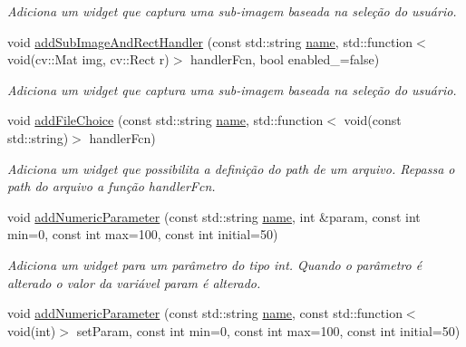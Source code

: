 \begin{DoxyCompactItemize}
\begin{DoxyCompactList}\small\item\em Adiciona um widget que captura uma sub-\/imagem baseada na seleção do usuário. \end{DoxyCompactList}\item 
\hypertarget{class_process_control_acbe523f427680c7b63756a998822c963}{}void \hyperlink{class_process_control_acbe523f427680c7b63756a998822c963}{add\+Sub\+Image\+And\+Rect\+Handler} (const std\+::string \hyperlink{class_process_control_abc29e461e01cc0c712944f8f47f91331}{name}, std\+::function$<$ void(cv\+::\+Mat img, cv\+::\+Rect r)$>$ handler\+Fcn, bool enabled\+\_\+=false)\label{class_process_control_acbe523f427680c7b63756a998822c963}

\begin{DoxyCompactList}\small\item\em Adiciona um widget que captura uma sub-\/imagem baseada na seleção do usuário. \end{DoxyCompactList}\item 
\hypertarget{class_process_control_a45754e768e48f832b466b9e2fe664d31}{}void \hyperlink{class_process_control_a45754e768e48f832b466b9e2fe664d31}{add\+File\+Choice} (const std\+::string \hyperlink{class_process_control_abc29e461e01cc0c712944f8f47f91331}{name}, std\+::function$<$ void(const std\+::string)$>$ handler\+Fcn)\label{class_process_control_a45754e768e48f832b466b9e2fe664d31}

\begin{DoxyCompactList}\small\item\em Adiciona um widget que possibilita a definição do path de um arquivo. Repassa o path do arquivo a função handler\+Fcn. \end{DoxyCompactList}\item 
\hypertarget{class_process_control_a2eeb77e2749ce88b06708aed586c9e68}{}void \hyperlink{class_process_control_a2eeb77e2749ce88b06708aed586c9e68}{add\+Numeric\+Parameter} (const std\+::string \hyperlink{class_process_control_abc29e461e01cc0c712944f8f47f91331}{name}, int \&param, const int min=0, const int max=100, const int initial=50)\label{class_process_control_a2eeb77e2749ce88b06708aed586c9e68}

\begin{DoxyCompactList}\small\item\em Adiciona um widget para um parâmetro do tipo int. Quando o parâmetro é alterado o valor da variável param é alterado. \end{DoxyCompactList}\item 
\hypertarget{class_process_control_a05adea2771aad5d07683f1da4027391c}{}void \hyperlink{class_process_control_a05adea2771aad5d07683f1da4027391c}{add\+Numeric\+Parameter} (const std\+::string \hyperlink{class_process_control_abc29e461e01cc0c712944f8f47f91331}{name}, const std\+::function$<$ void(int)$>$ set\+Param, const int min=0, const int max=100, const int initial=50)\label{class_process_control_a05adea2771aad5d07683f1da4027391c}


\end{DoxyCompactItemize}
